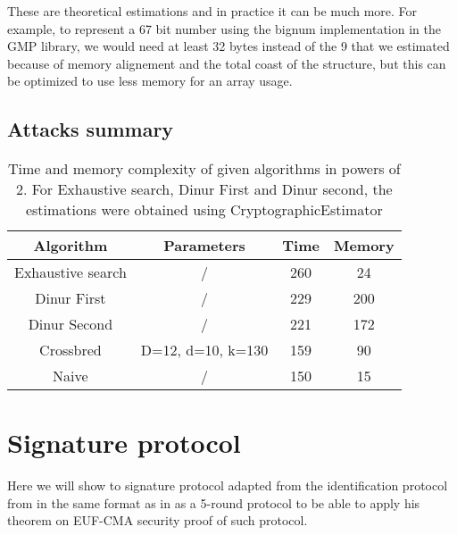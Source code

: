 \documentclass[english]{article}
\begin{document}
		These are theoretical estimations and in practice it can be much more. For example, to represent a 67 bit number using the bignum implementation in the GMP library, we would need at least 32 bytes instead of the 9 that we estimated because of memory alignement and the total coast of the structure, but this can be optimized to use less memory for an array usage.
		
	\subsection{Attacks summary}
		\begin{table}[h!]
		\begin{center}
			\begin{tabular}{|c|c|c|c|}
				\hline
				Algorithm & Parameters & Time & Memory \\
				\hline
				Exhaustive search & / & 260 & 24 \\
				\hline
				Dinur First & / & 229 & 200 \\
				\hline
				Dinur Second & / & 221 & 172 \\
				\hline
				Crossbred & D=12, d=10, k=130 & 159 & 90 \\
				\hline
				Naive & / & 150 & 15 \\
				\hline
			\end{tabular}
			\caption{Time and memory complexity of given algorithms in powers of 2.
				For Exhaustive search, Dinur First and Dinur second, the estimations were obtained using CryptographicEstimator \cite{EVZ+24}}
			\label{tab_attacks}
		\end{center}
		\end{table}
		
\printbibliography

\appendix
\section{Signature protocol}
	Here we will show to signature protocol adapted from the identification protocol from \cite{HJ23} in the same format as in \cite{feneu2023} as a 5-round protocol to be able to apply his theorem on EUF-CMA security proof of such protocol.
		
\end{document}
